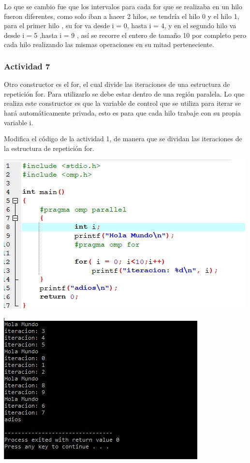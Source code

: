 \documentclass[12pt,letterpaper]{article}
\begin{document}
Lo que se cambio fue que los intervalos para cada for que se realizaba en un hilo fueron diferentes, como solo iban a hacer 2 hilos, se tendría el hilo 0 y el hilo 1, para el primer hilo , su for va desde i = 0, hasta i = 4, y en el segundo hilo va desde i = 5 ,hasta i = 9 , así se recorre el entero de tamaño 10 por completo pero cada hilo realizando las mismas operaciones en su mitad perteneciente.

\subsubsection*{Actividad 7}

Otro constructor es el for, el cual divide las iteraciones de una estructura de repetición for. Para utilizarlo se debe estar dentro de una región paralela.
Lo que realiza este constructor es que la variable de control que se utiliza para iterar se hará automáticamente privada, esto es para que cada hilo trabaje con su propia variable i.

Modifica el código de la actividad 1, de manera que se dividan las iteraciones de la estructura de repetición for.

\includegraphics[scale=.8]{ejercicio7.jpg}


\includegraphics[scale=1]{ejercicio71.jpg}
\end{document}

